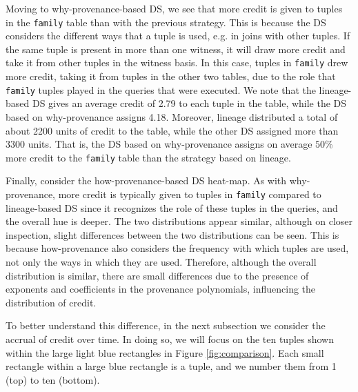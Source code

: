 Moving to why-provenance-based DS, we see that more credit is given to tuples in the \texttt{family} table than with the previous strategy. This is because the DS considers the different ways that a tuple is used, e.g. in joins with other tuples. If the same tuple is present in more than one witness, it will draw more credit and take it from  other tuples in the witness basis. In this case, tuples in \texttt{family} drew more credit, taking it from tuples in the other two tables, due to the role that \texttt{family}  tuples played in the queries that were executed. 
\textcolor{correction}{We note that the lineage-based DS gives an average credit of 2.79 to each tuple in the table, while the DS based on why-provenance assigns 4.18. Moreover, lineage distributed a total of about 2200 units of credit to the table, while the other DS assigned more than 3300 units. That is, the DS based on why-provenance assigns on average $50\%$ more credit to the \texttt{family} table than the strategy based on lineage.}


Finally, consider the how-provenance-based DS heat-map. %
As with why-provenance, more credit is typically given to tuples in \texttt{family} compared to lineage-based DS since it recognizes the role of these tuples in the queries, and the overall hue is deeper.  
The two distributions appear similar, although on closer inspection, slight differences between the two distributions can be seen. 
This is because how-provenance also considers the frequency with which tuples are used, not only the ways in which they are used. Therefore, although the overall distribution is similar, there are small differences due to the presence of exponents and coefficients in the provenance polynomials, influencing the distribution of credit. 

To better understand this difference, in the next subsection we consider the accrual of credit over time.  In doing so, we will focus on the ten tuples shown within the large light blue rectangles in Figure \ref{fig:comparison}.  Each small rectangle within a large blue rectangle is a tuple, and we number them from 1 (top) to ten (bottom).  

